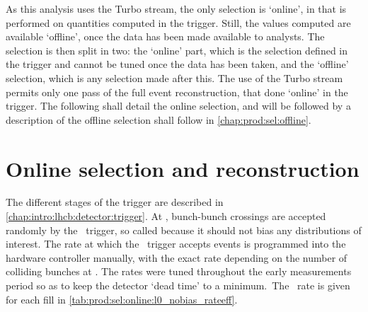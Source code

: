 As this analysis uses the Turbo stream, the only selection is `online', in that 
is performed on quantities computed in the trigger.
Still, the values computed are available `offline', once the data has been made 
available to analysts.
The selection is then split in two: the `online' part, which is the selection 
defined in the trigger and cannot be tuned once the data has been taken, and 
the `offline' selection, which is any selection made after this.
The use of the Turbo stream permits only one pass of the full event 
reconstruction, that done `online' in the trigger.
The following  shall detail the online 
selection, and will be followed by a description of the offline selection shall 
follow in \cref{chap:prod:sel:offline}.

\section{Online selection and reconstruction}
\label{chap:prod:sel:online}

The different stages of the trigger are described in 
\cref{chap:intro:lhcb:detector:trigger}.
At \lzero, bunch-bunch crossings are accepted randomly by the \nobias\ trigger, 
so called because it should not bias any distributions of interest.
The rate at which the \nobias\ trigger accepts events is programmed into the 
hardware controller manually, with the exact rate depending on the number of 
colliding bunches at \lhcb.
The rates were tuned throughout the early measurements period so as to keep the 
detector `dead time' to a minimum.\footnotemark\
The \lzero\ rate is given for each fill in 
\cref{tab:prod:sel:online:l0_nobias_rateeff}.


